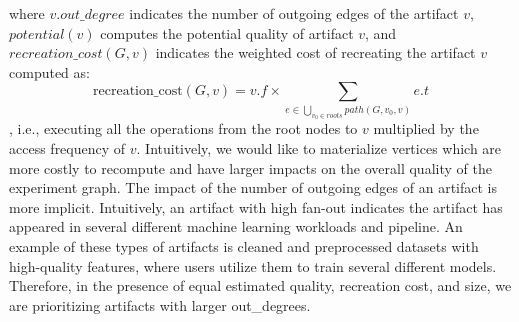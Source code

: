 where $v.out\_degree$ indicates the number of outgoing edges of the artifact $v$, $potential(v)$ computes the potential quality of artifact $v$, and $recreation\_cost(G,v)$ indicates the weighted cost of recreating the artifact $v$ computed as:
\[
\text{recreation\_cost}(G,v) = v.f \times \sum\limits_{e \in \bigcup\limits_{v_{0}\in roots} path(G, v_{0}, v)} e.t\]
, i.e., executing all the operations from the root nodes to $v$ multiplied by the access frequency of $v$.
Intuitively, we would like to materialize vertices which are more costly to recompute and have larger impacts on the overall quality of the experiment graph.
The impact of the number of outgoing edges of an artifact is more implicit.
Intuitively, an artifact with high fan-out indicates the artifact has appeared in several different machine learning workloads and pipeline.
An example of these types of artifacts is cleaned and preprocessed datasets with high-quality features, where users utilize them to train several different models.
Therefore, in the presence of equal estimated quality, recreation cost, and size, we are prioritizing artifacts with larger out\_degrees.

